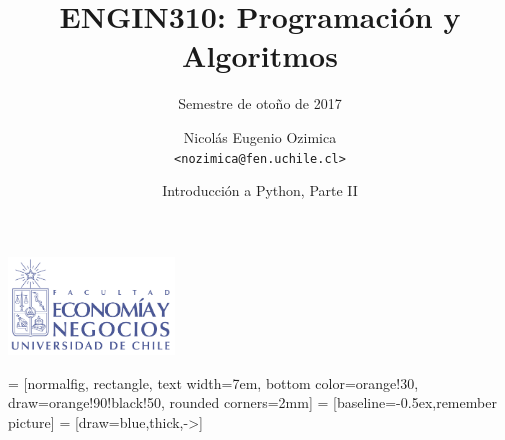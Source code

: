 \documentclass[12pt,xcolor={dvipsnames,x11names},t,table]{beamer}
\title{ENGIN310: Programación y Algoritmos}
\subtitle{Semestre de otoño de 2017}
\author{Nicolás Eugenio Ozimica\\[.4em]\texttt{<nozimica@fen.uchile.cl>}}
\date{Introducción a Python, Parte II}
\begin{document}
\begin{frame}[plain]
    \centering \includegraphics[height=26mm]{img/logoFen.png}\\
    \centering
    \titlepage
\end{frame}

\def\opacityblock{.3}

 = [normalfig, rectangle, text width=7em, bottom color=orange!30, draw=orange!90!black!50, rounded corners=2mm]
 = [baseline=-0.5ex,remember picture]
 = [draw=blue,thick,->]

\def\tightlist{}





% 

% 


% 
\end{document}
